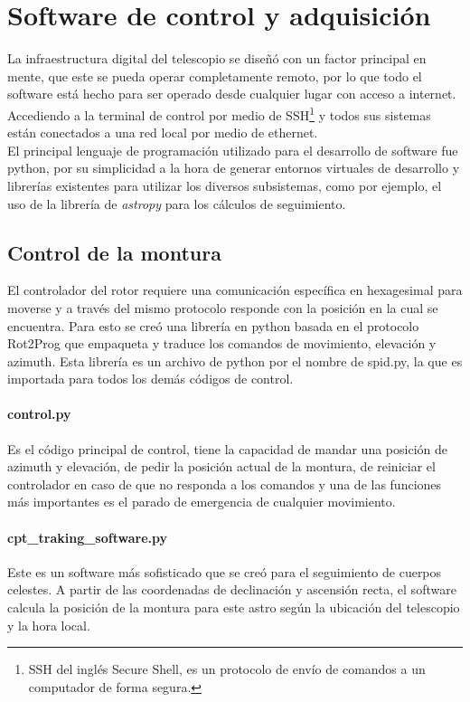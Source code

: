 \section{Software de control y adquisición} \label{sec:software}

La infraestructura digital del telescopio se diseñó con un factor principal en mente, que este se pueda operar completamente remoto, por lo que todo el software está hecho para ser operado desde cualquier lugar con acceso a internet. Accediendo a la terminal de control por medio de SSH\footnote{SSH del inglés Secure Shell, es un protocolo de envío de comandos a un computador de forma segura.} y todos sus sistemas están conectados a una red local por medio de ethernet.\\

El principal lenguaje de programación utilizado para el desarrollo de software fue python, por su simplicidad a la hora de generar entornos virtuales de desarrollo y librerías existentes para utilizar los diversos subsistemas, como por ejemplo, el uso de la librería de \textit{astropy} para los cálculos de seguimiento.\\

\subsection{Control de la montura}

El controlador del rotor requiere una comunicación específica en hexagesimal para moverse y a través del mismo protocolo responde con la posición en la cual se encuentra. Para esto se creó una librería en python basada en el protocolo Rot2Prog \cite{rot2prog} que empaqueta y traduce los comandos de movimiento, elevación y azimuth. Esta librería es un archivo de python por el nombre de spid.py, la que es importada para todos los demás códigos de control.\\

\paragraph{control.py} Es el código principal de control, tiene la capacidad de mandar una posición de azimuth y elevación, de pedir la posición actual de la montura, de reiniciar el controlador en caso de que no responda a los comandos y una de las funciones más importantes es el parado de emergencia de cualquier movimiento.\\

\paragraph{cpt\_traking\_software.py} Este es un software más sofisticado que se creó para el seguimiento de cuerpos celestes. A partir de las coordenadas de declinación y ascensión recta, el software calcula la posición de la montura para este astro según la ubicación del telescopio y la hora local.\\

